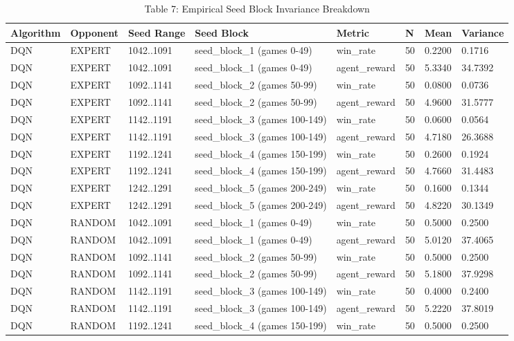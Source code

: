 \begin{table}
\caption{Table 7: Empirical Seed Block Invariance Breakdown}
\label{tab:table7_seed_block_summary}
\begin{tabular}{llllllll}
\toprule
Algorithm & Opponent & Seed Range & Seed Block & Metric & N & Mean & Variance \\
\midrule
DQN & EXPERT & 1042..1091 & seed\_block\_1 (games 0-49) & win\_rate & 50 & 0.2200 & 0.1716 \\
DQN & EXPERT & 1042..1091 & seed\_block\_1 (games 0-49) & agent\_reward & 50 & 5.3340 & 34.7392 \\
DQN & EXPERT & 1092..1141 & seed\_block\_2 (games 50-99) & win\_rate & 50 & 0.0800 & 0.0736 \\
DQN & EXPERT & 1092..1141 & seed\_block\_2 (games 50-99) & agent\_reward & 50 & 4.9600 & 31.5777 \\
DQN & EXPERT & 1142..1191 & seed\_block\_3 (games 100-149) & win\_rate & 50 & 0.0600 & 0.0564 \\
DQN & EXPERT & 1142..1191 & seed\_block\_3 (games 100-149) & agent\_reward & 50 & 4.7180 & 26.3688 \\
DQN & EXPERT & 1192..1241 & seed\_block\_4 (games 150-199) & win\_rate & 50 & 0.2600 & 0.1924 \\
DQN & EXPERT & 1192..1241 & seed\_block\_4 (games 150-199) & agent\_reward & 50 & 4.7660 & 31.4483 \\
DQN & EXPERT & 1242..1291 & seed\_block\_5 (games 200-249) & win\_rate & 50 & 0.1600 & 0.1344 \\
DQN & EXPERT & 1242..1291 & seed\_block\_5 (games 200-249) & agent\_reward & 50 & 4.8220 & 30.1349 \\
DQN & RANDOM & 1042..1091 & seed\_block\_1 (games 0-49) & win\_rate & 50 & 0.5000 & 0.2500 \\
DQN & RANDOM & 1042..1091 & seed\_block\_1 (games 0-49) & agent\_reward & 50 & 5.0120 & 37.4065 \\
DQN & RANDOM & 1092..1141 & seed\_block\_2 (games 50-99) & win\_rate & 50 & 0.5000 & 0.2500 \\
DQN & RANDOM & 1092..1141 & seed\_block\_2 (games 50-99) & agent\_reward & 50 & 5.1800 & 37.9298 \\
DQN & RANDOM & 1142..1191 & seed\_block\_3 (games 100-149) & win\_rate & 50 & 0.4000 & 0.2400 \\
DQN & RANDOM & 1142..1191 & seed\_block\_3 (games 100-149) & agent\_reward & 50 & 5.2220 & 37.8019 \\
DQN & RANDOM & 1192..1241 & seed\_block\_4 (games 150-199) & win\_rate & 50 & 0.5000 & 0.2500 \\

\end{tabular}
\end{table}
